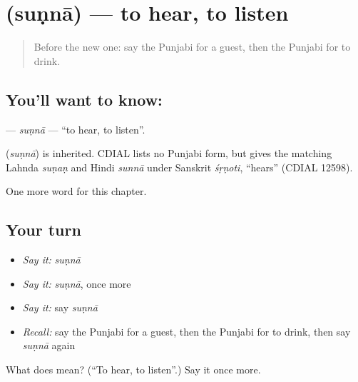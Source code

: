 \section[\texorpdfstring{\pa{ਸੁਣਨਾ} (suṇnā)}{ਸੁਣਨਾ (suṇnā)}]{ (suṇnā) — to hear, to listen}

\label{lesson:PA-C56-sunna}



\begin{quote}
Before the new one: say the Punjabi for a guest, then the Punjabi for to drink.
\end{quote}

\subsection*{You'll want to know: }
\textbf{} — \emph{suṇnā} — \textquotedblleft{}to hear, to listen\textquotedblright{}.

\begin{cousinweb}
\textbf{} (\emph{suṇnā}) is inherited. CDIAL lists no Punjabi form, but gives the matching Lahnda \emph{suṇaṇ} and Hindi \emph{sunnā} under Sanskrit \emph{śṛṇoti}, \textquotedblleft{}hears\textquotedblright{} (CDIAL 12598).
\end{cousinweb}

\begin{grammarlens}[title={What you've built}]
One more word for this chapter.
\end{grammarlens}

\subsection*{Your turn}
\begin{itemize}
\raggedright
  \item \emph{Say it:} \emph{suṇnā}
  \item \emph{Say it:} \emph{suṇnā}, once more
  \item \emph{Say it:} say \emph{suṇnā}
  \item \emph{Recall:} say the Punjabi for a guest, then the Punjabi for to drink, then say \emph{suṇnā} again
\end{itemize}

\begin{tcolorbox}[breakable,colback=teal!4,colframe=teal!35!black,title={Before you move on}]
What does  mean? (\textquotedblleft{}To hear, to listen\textquotedblright{}.) Say it once more.
\end{tcolorbox}
